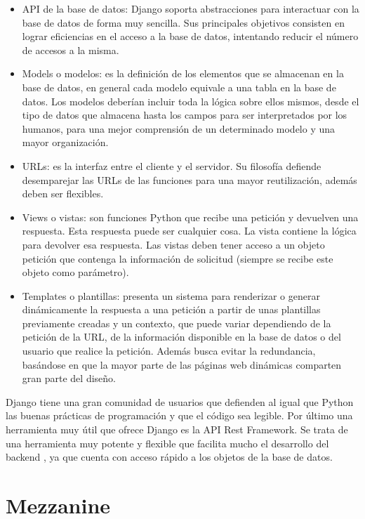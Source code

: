 \begin{itemize}
\item API de la base de datos: Django soporta abstracciones para interactuar con la base de datos de forma muy sencilla. Sus principales objetivos consisten en lograr eficiencias en el acceso a la base de datos, intentando reducir el número de accesos a la misma.
\item Models o modelos: es la definición de los elementos que se almacenan en la base de datos, en general cada modelo equivale a una tabla en la base de datos. Los modelos deberían incluir toda la lógica sobre ellos mismos, desde el tipo de datos que almacena hasta los campos para ser interpretados por los humanos,  para una mejor comprensión de un determinado modelo y una mayor organización.
\item URLs: es la interfaz entre el cliente y el servidor. Su filosofía defiende desemparejar las URLs de las funciones para una mayor reutilización, además deben ser flexibles.
\item Views o vistas: son funciones Python que recibe una petición y devuelven una respuesta. Esta respuesta puede ser cualquier cosa. La vista contiene la lógica para devolver esa respuesta. Las vistas deben tener acceso a un objeto petición que contenga la información de solicitud (siempre se recibe este objeto como parámetro). 
\item Templates o plantillas: presenta un sistema para renderizar o generar dinámicamente la respuesta a una petición a partir de unas plantillas previamente creadas y un contexto, que puede variar dependiendo de la petición de la URL, de la información disponible en la base de datos o del usuario que realice la petición. Además busca evitar la redundancia, basándose en que la mayor parte de las páginas web dinámicas comparten gran parte del diseño. 
\end{itemize}


Django tiene una gran comunidad de usuarios que defienden al igual que Python las buenas prácticas de programación y que el código sea legible.
Por último una herramienta muy útil que ofrece Django es la API Rest Framework. Se trata de una herramienta muy potente y flexible que facilita mucho el desarrollo del backend , ya que cuenta con acceso rápido a los objetos de la base de datos.

\section{Mezzanine} 
\label{sec:mezzanine}

